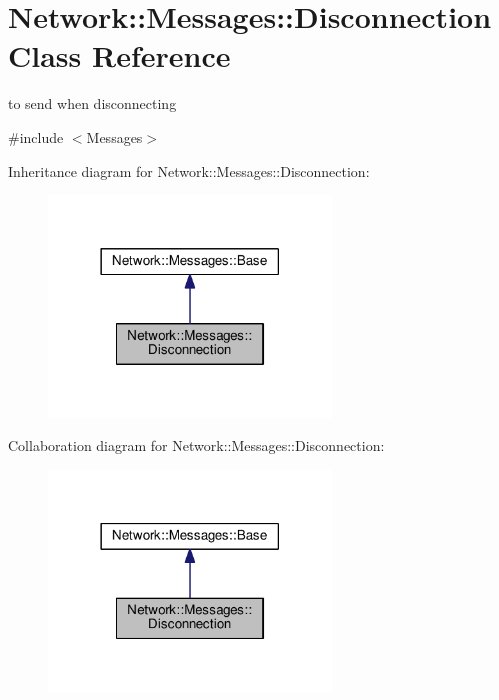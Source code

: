 \hypertarget{class_network_1_1_messages_1_1_disconnection}{}\section{Network\+:\+:Messages\+:\+:Disconnection Class Reference}
\label{class_network_1_1_messages_1_1_disconnection}


to send when disconnecting  




{\ttfamily \#include $<$Messages$>$}



Inheritance diagram for Network\+:\+:Messages\+:\+:Disconnection\+:
\nopagebreak
\begin{figure}[H]
\begin{center}
\leavevmode
\includegraphics[width=213pt]{class_network_1_1_messages_1_1_disconnection__inherit__graph}
\end{center}
\end{figure}


Collaboration diagram for Network\+:\+:Messages\+:\+:Disconnection\+:
\nopagebreak
\begin{figure}[H]
\begin{center}
\leavevmode
\includegraphics[width=213pt]{class_network_1_1_messages_1_1_disconnection__coll__graph}
\end{center}
\end{figure}
